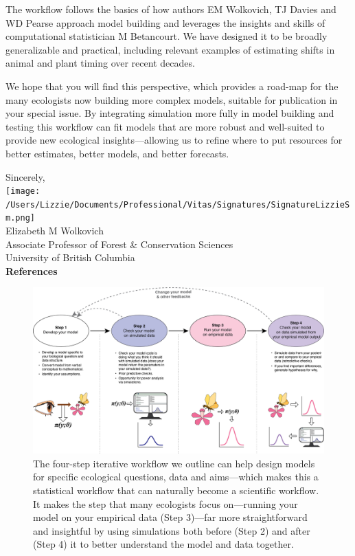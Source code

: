 \documentclass[11pt]{article}
\begin{document}
The workflow follows the basics of how authors EM Wolkovich, TJ Davies and WD Pearse approach model building and leverages the insights and skills of computational statistician M Betancourt. We have designed it to be broadly generalizable and practical, including relevant examples of estimating shifts in animal and plant timing over recent decades. %

We hope that you will find this perspective, which provides a road-map for the many ecologists now building more complex models, suitable for publication in your special issue. By integrating simulation more fully in model building and testing this workflow can fit models that are more robust and well-suited to provide new ecological insights---allowing us to refine where to put resources for better estimates, better models, and better forecasts. %

Sincerely,\\

\texttt{[image: /Users/Lizzie/Documents/Professional/Vitas/Signatures/SignatureLizzieSm.png]} \\

Elizabeth M Wolkovich\\
Associate Professor of Forest \& Conservation Sciences\\ 
University of British Columbia\\

{\bf References}
\vspace{-8ex}



\vspace{5ex}

\begin{figure}[ht]
\centering
\noindent \includegraphics[width=1\textwidth]{..//figures/workflow.png}
\caption{The four-step iterative workflow we outline can help design models for specific ecological questions, data and aims---which makes this a statistical workflow that can naturally become a scientific workflow. It makes the step that many ecologists focus on---running your model on your empirical data (Step 3)---far more straightforward and insightful by using simulations both before (Step 2) and after (Step 4) it to better understand the model and data together.}
\label{fig:workflow}
\end{figure}
\end{document}
